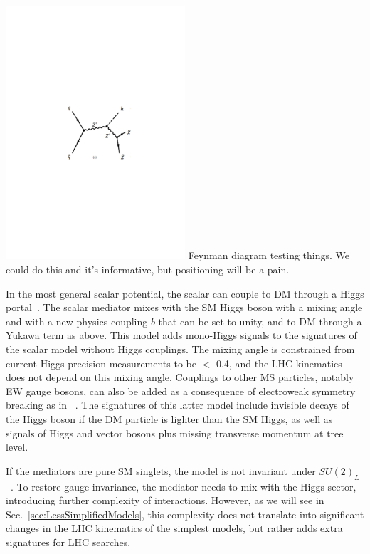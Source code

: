 \begin{marginnote}[]
\vskip-100pt
\includegraphics[width=0.5\textwidth]{figures/test-feynman.pdf}
\vskip-100pt
Feynman diagram testing things. We could do this and it's informative, but positioning will be a pain. 
\end{marginnote}

In the most general scalar potential, the scalar can couple to DM through a Higgs portal~\cite{Berlin:2014cfa}. The scalar mediator mixes with the SM Higgs boson with a mixing angle \sinthetahS and with a new physics coupling $b$ that can be set to unity, and to DM through a Yukawa term as above. This model adds mono-Higgs signals to the signatures of the scalar model without Higgs couplings. The mixing angle is constrained from current Higgs precision measurements to be \sinthetahS $<$ 0.4, and the LHC kinematics does not depend on this mixing angle. Couplings to other MS particles, notably EW gauge bosons, can also be added as a consequence of electroweak symmetry breaking as in ~\cite{Bauer:2016gys,Englert:2016joy}. The signatures of this latter model include invisible decays of the Higgs boson if the DM particle is lighter than the SM Higgs, as well as signals of Higgs and vector bosons plus missing transverse momentum at tree level. 


If the mediators are pure SM singlets, the model is not invariant under $SU(2)_L$~\cite{Bell:2016ekl}. 
To restore gauge invariance, the mediator needs to mix with the Higgs sector, introducing further complexity of interactions. However, as we will see in Sec.~\ref{sec:LessSimplifiedModels}, this complexity does not translate into significant changes in the LHC kinematics of the simplest models, but rather adds extra signatures for LHC searches.

